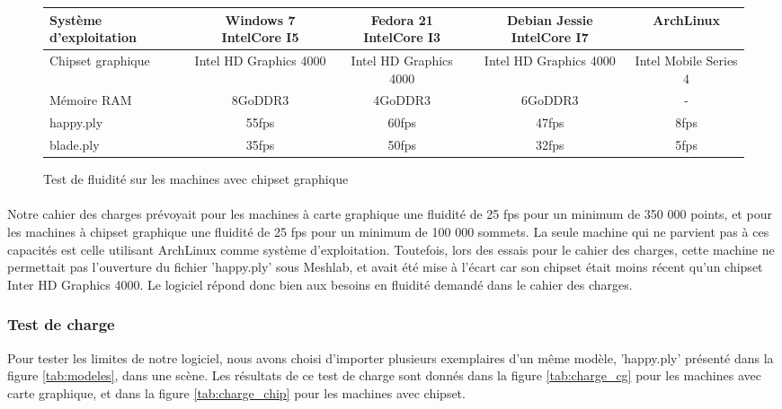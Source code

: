 \begin{figure}[h]
  \begin{changemargin}{-4cm}{-4cm}
    \centering
    \begin{tabular}{|l|c|c|c|c|}
      \hline
      Système d'exploitation & Windows 7 IntelCore I5 & Fedora 21 IntelCore I3 & Debian Jessie IntelCore I7 & ArchLinux \\ \hline
      Chipset graphique &  Intel HD Graphics 4000 & Intel HD Graphics 4000 & Intel HD Graphics 4000 & Intel Mobile Series 4 \\ \hline
      Mémoire RAM & 8GoDDR3 & 4GoDDR3  & 6GoDDR3 & -\\ \hline \hline
      happy.ply & 55fps & 60fps & 47fps & 8fps\\ \hline
      blade.ply & 35fps & 50fps & 32fps & 5fps\\ \hline
    \end{tabular}
  \end{changemargin}
  \caption{Test de fluidité sur les machines avec chipset graphique}
  \label{tab:fps_chip}
\end{figure}

\paragraph{}
Notre cahier des charges prévoyait pour les machines à carte graphique une fluidité de 25 fps pour un minimum de 350 000 points, et pour les machines à chipset graphique une fluidité de 25 fps pour un minimum de 100 000 sommets. La seule machine qui ne parvient pas à ces capacités est celle utilisant ArchLinux comme système d'exploitation. Toutefois, lors des essais pour le cahier des charges, cette machine ne permettait pas l'ouverture du fichier 'happy.ply' sous Meshlab, et avait été mise à l'écart car son chipset était moins récent qu'un chipset Inter HD Graphics 4000. Le logiciel répond donc bien aux besoins en fluidité demandé dans le cahier des charges.

\subsubsection{Test de charge}
Pour tester les limites de notre logiciel, nous avons choisi d'importer plusieurs exemplaires d'un même modèle, 'happy.ply' présenté dans la figure \ref{tab:modeles}, dans une scène. Les résultats de ce test de charge sont donnés dans la figure \ref{tab:charge_cg} pour les machines avec carte graphique, et dans la figure \ref{tab:charge_chip} pour les machines avec chipset.

